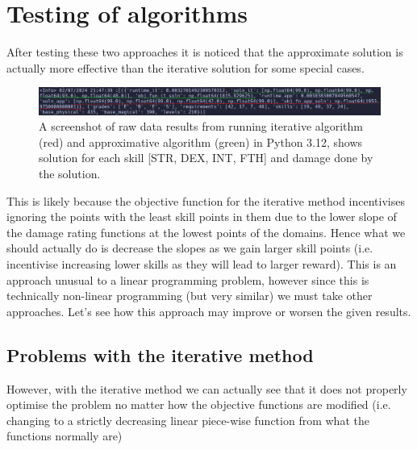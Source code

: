 \documentclass{article}
\begin{document}
\section{Testing of algorithms}
After testing these two approaches it is noticed that the approximate solution is actually more effective than the iterative solution for some special cases.
\begin{figure}[!h]
    \centering
    \includegraphics[width=\textwidth]{special_case_simplex_edited.png}
    \caption{A screenshot of raw data results from running iterative algorithm (red) and approximative algorithm (green) in Python 3.12, shows solution for each skill [STR, DEX, INT, FTH] and damage done by the solution.}
    \label{fig:screenshot-results}
\end{figure}
\par This is likely because the objective function for the iterative method incentivises ignoring the points with the least skill points in them due to the lower slope of the damage rating functions at the lowest points of the domains. Hence what we should actually do is decrease the slopes as we gain larger skill points (i.e. incentivise increasing lower skills as they will lead to larger reward). This is an approach unusual to a linear programming problem, however since this is technically non-linear programming (but very similar) we must take other approaches. Let's see how this approach may improve or worsen the given results.
\subsection{Problems with the iterative method}
However, with the iterative method we can actually see that it does not properly optimise the problem no matter how the objective functions are modified (i.e. changing to a strictly decreasing linear piece-wise function from what the functions normally are)

\printbibliography[heading=bibintoc, title={Bibliography}]
\end{document}
